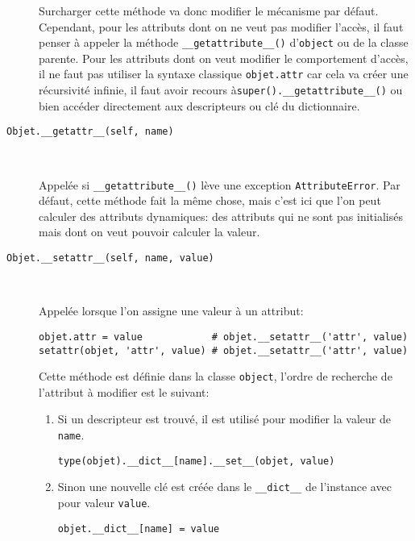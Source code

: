 \begin{description}
    Surcharger cette méthode va donc modifier le mécanisme par défaut. Cependant, pour les attributs dont on ne veut pas
    modifier l'accès, il faut penser à appeler la méthode \texttt{__getattribute__()} d'\texttt{object}
    ou de la classe parente. Pour les attributs dont on veut modifier le comportement d'accès, il ne faut pas utiliser
    la syntaxe classique \texttt{objet.attr} car cela va créer une récursivité infinie, il faut avoir
    recours à\break\texttt{super().__getattribute__()} ou bien accéder directement aux descripteurs ou clé du dictionnaire.

    \item[\texttt{Objet.__getattr__(self, name)}]~

    Appelée si \texttt{__getattribute__()} lève une exception \texttt{AttributeError}. Par défaut, cette méthode fait la même chose, mais c'est ici que l'on peut calculer des attributs dynamiques: des attributs qui ne sont pas initialisés mais dont on veut pouvoir calculer la valeur.

    \item[\texttt{Objet.__setattr__(self, name, value)}]~

Appelée lorsque l'on assigne une valeur à un attribut: 
    \begin{verbatim}
objet.attr = value            # objet.__setattr__('attr', value)
setattr(objet, 'attr', value) # objet.__setattr__('attr', value)
    \end{verbatim}
    
    Cette méthode est définie dans la classe \texttt{object}, l'ordre de recherche de l'attribut à modifier
    est le suivant:
    \begin{enumerate}
        \item Si un descripteur est trouvé, il est utilisé pour modifier la valeur de \texttt{name}.
        \begin{verbatim}
type(objet).__dict__[name].__set__(objet, value)
        \end{verbatim}
        \item Sinon une nouvelle clé est créée dans le \texttt{__dict__} de l'instance avec pour valeur
        \texttt{value}.
        \begin{verbatim}
objet.__dict__[name] = value
        \end{verbatim}
    \end{enumerate}


\end{description}
